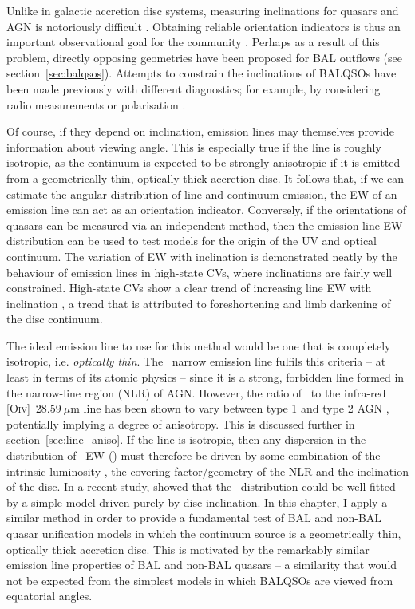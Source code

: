 Unlike in galactic accretion disc systems, measuring inclinations
for quasars and AGN is notoriously difficult \citep[see e.g.][]{marin2016}. 
Obtaining reliable orientation indicators is thus an important observational
goal for the community \citep[see e.g.][]{marin2016}. 
Perhaps as a result of this problem, 
directly opposing geometries have been proposed for 
BAL outflows (see section~\ref{sec:balqsos}). 
Attempts to constrain the inclinations
of BALQSOs have been made previously with
different diagnostics; for example, by considering 
radio measurements \citep{zhou2006,dipompeo2012a} or
polarisation \citep{brotherton2006}.  

Of course, if they depend on inclination, emission lines may themselves
provide information about viewing angle. 
This is especially true if the line is roughly isotropic, as 
the continuum is expected to be strongly anisotropic if it is emitted from a 
geometrically thin, optically thick accretion disc. 
It follows that, if we can estimate the angular distribution of line and continuum emission,
the EW of an emission line can act as an orientation indicator. Conversely, if the orientations
of quasars can be measured via an independent method, 
then the emission line EW distribution can be used to test models
for the origin of the UV and optical continuum.
The variation of EW with inclination is demonstrated neatly by the behaviour 
of emission lines in high-state CVs, where inclinations are fairly well constrained.
High-state CVs show a clear trend of increasing line EW with inclination 
\citep[][see also sections~\ref{sec:NLs} and \ref{sec:modela_spectra}]{hessman1984,patterson1984,echevarria1988,noebauer},
a trend that is attributed to foreshortening and limb darkening of the disc continuum.

The ideal emission line to use for this method would be one that is completely isotropic,
i.e. {\em optically thin}. The \oiiifull\ narrow emission line fulfils this criteria -- at least in terms of its atomic physics -- since it 
is a strong, forbidden line formed in the narrow-line region (NLR) of AGN. However,
the ratio of \oiiifull\ to the infra-red [O\textsc{iv}]~$28.59~\mu$m line has been shown to
vary between type 1 and type 2 AGN \citep{kraemer2011}, potentially implying a degree of anisotropy.
This is discussed further in section~\ref{sec:line_aniso}.
If the line is isotropic, then any dispersion in the distribution of \oiiifull\ EW (\ewo) 
must therefore be driven by some combination of
the intrinsic luminosity \citep{borosongreen}, 
the covering factor/geometry of the NLR \citep{baskin2005} and the 
inclination of the disc. In a recent study, \citet{risaliti2011} showed that 
the \ewo\ distribution could be well-fitted by a simple model driven purely by disc inclination.
In this chapter, I apply a similar method in order to provide a fundamental test of
BAL and non-BAL quasar unification models in which the continuum source is a geometrically
thin, optically thick accretion disc. This is motivated by the remarkably similar
emission line properties of BAL and non-BAL quasars -- a similarity that would not
be expected from the simplest models in which BALQSOs are viewed from equatorial angles.

